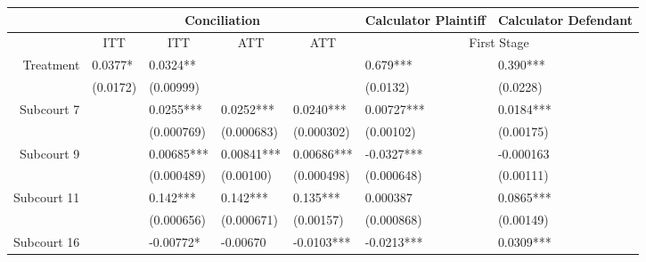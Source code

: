 \begin{tabular}{rrrrrrr}
\toprule
      & \multicolumn{4}{c}{Conciliation} & \multicolumn{1}{c}{Calculator Plaintiff} & \multicolumn{1}{c}{Calculator Defendant} \\
\midrule
      & \multicolumn{1}{c}{ITT} & \multicolumn{1}{c}{ITT} & \multicolumn{1}{c}{ATT} & \multicolumn{1}{c}{ATT} & \multicolumn{2}{c}{First Stage} \\
      \midrule
      \midrule
Treatment  & \multicolumn{1}{l}{0.0377*} & \multicolumn{1}{l}{0.0324**} & \multicolumn{1}{l}{} & \multicolumn{1}{l}{} & \multicolumn{1}{l}{0.679***} & \multicolumn{1}{l}{0.390***} \\
      & \multicolumn{1}{l}{(0.0172)} & \multicolumn{1}{l}{(0.00999)} & \multicolumn{1}{l}{} & \multicolumn{1}{l}{} & \multicolumn{1}{l}{(0.0132)} & \multicolumn{1}{l}{(0.0228)} \\
Subcourt 7 & \multicolumn{1}{l}{} & \multicolumn{1}{l}{0.0255***} & \multicolumn{1}{l}{0.0252***} & \multicolumn{1}{l}{0.0240***} & \multicolumn{1}{l}{0.00727***} & \multicolumn{1}{l}{0.0184***} \\
      & \multicolumn{1}{l}{} & \multicolumn{1}{l}{(0.000769)} & \multicolumn{1}{l}{(0.000683)} & \multicolumn{1}{l}{(0.000302)} & \multicolumn{1}{l}{(0.00102)} & \multicolumn{1}{l}{(0.00175)} \\
Subcourt 9 & \multicolumn{1}{l}{} & \multicolumn{1}{l}{0.00685***} & \multicolumn{1}{l}{0.00841***} & \multicolumn{1}{l}{0.00686***} & \multicolumn{1}{l}{-0.0327***} & \multicolumn{1}{l}{-0.000163} \\
      & \multicolumn{1}{l}{} & \multicolumn{1}{l}{(0.000489)} & \multicolumn{1}{l}{(0.00100)} & \multicolumn{1}{l}{(0.000498)} & \multicolumn{1}{l}{(0.000648)} & \multicolumn{1}{l}{(0.00111)} \\
Subcourt 11 & \multicolumn{1}{l}{} & \multicolumn{1}{l}{0.142***} & \multicolumn{1}{l}{0.142***} & \multicolumn{1}{l}{0.135***} & \multicolumn{1}{l}{0.000387} & \multicolumn{1}{l}{0.0865***} \\
      & \multicolumn{1}{l}{} & \multicolumn{1}{l}{(0.000656)} & \multicolumn{1}{l}{(0.000671)} & \multicolumn{1}{l}{(0.00157)} & \multicolumn{1}{l}{(0.000868)} & \multicolumn{1}{l}{(0.00149)} \\
Subcourt 16 & \multicolumn{1}{l}{} & \multicolumn{1}{l}{-0.00772*} & \multicolumn{1}{l}{-0.00670} & \multicolumn{1}{l}{-0.0103***} & \multicolumn{1}{l}{-0.0213***} & \multicolumn{1}{l}{0.0309***} \\

\end{tabular}
